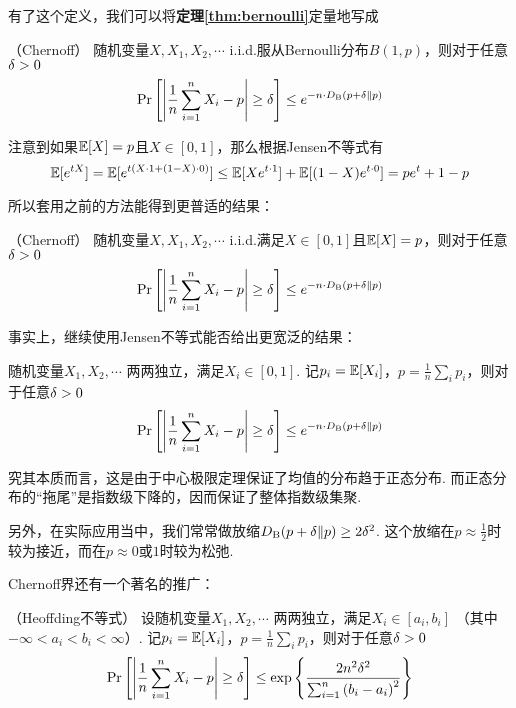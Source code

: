 有了这个定义，我们可以将\textbf{定理\ref{thm:bernoulli}}定量地写成 
\begin{theorem} （Chernoff） \label{thm:chernoff}
    随机变量$X, X_1, X_2, \cdots$ i.i.d.服从Bernoulli分布$B(1,p)$，则对于任意$\delta > 0$ 
    \[
    \Pr\left[
        \left\vert
            \dfrac 1n \sum_{i=1}^n X_i - p
        \right\vert \ge \delta
    \right] \le e^{-n\cdot D_{\mathrm{B}}(p + \delta \| p)}
    \]
\end{theorem}

注意到如果$\mathbb{E}[X]=p$且$X \in [0,1]$，那么根据Jensen不等式有 
\[
\mathbb{E}[e^{tX}] = \mathbb{E}[e^{t(X\cdot 1 + (1-X)\cdot 0)}] \le \mathbb{E}[Xe^{t\cdot 1}] + \mathbb{E}[(1-X)e^{t\cdot 0}] =pe^t + 1-p
\]

所以套用之前的方法能得到更普适的结果：
\begin{corollary} （Chernoff）
    随机变量$X, X_1, X_2, \cdots$ i.i.d.满足$X\in [0, 1]$且$\mathbb{E}[X]=p$，则对于任意$\delta > 0$ 
    \[
    \Pr\left[
        \left\vert
            \dfrac 1n \sum_{i=1}^n X_i - p
        \right\vert \ge \delta
    \right] \le e^{-n\cdot D_{\mathrm{B}}(p + \delta \| p)}
    \]
\end{corollary}

事实上，继续使用Jensen不等式能否给出更宽泛的结果：
\begin{corollary} 
    随机变量$X_1, X_2, \cdots$ 两两独立，满足$X_i\in [0,1]$. 记$p_i = \mathbb{E}[X_i]$，$p = \frac{1}{n}\sum_i p_i$，则对于任意$\delta > 0$
    \[
    \Pr\left[
        \left\vert
            \dfrac 1n \sum_{i=1}^n X_i - p
        \right\vert \ge \delta
    \right] \le e^{-n\cdot D_{\mathrm{B}}(p + \delta \| p)}
    \]
\end{corollary}

究其本质而言，这是由于中心极限定理保证了均值的分布趋于正态分布. 而正态分布的“拖尾”是指数级下降的，因而保证了整体指数级集聚.

另外，在实际应用当中，我们常常做放缩$D_{\mathrm{B}}(p+\delta \| p) \ge 2\delta^2$. 这个放缩在$p \approx \frac 12$时较为接近，而在$p\approx 0$或$1$时较为松弛.

Chernoff界还有一个著名的推广：
\begin{theorem} （Heoffding不等式）
    设随机变量$X_1, X_2, \cdots$ 两两独立，满足$X_i\in [a_i, b_i]$ （其中$-\infty < a_i < b_i < \infty$）. 记$p_i = \mathbb{E}[X_i]$，$p = \frac{1}{n}\sum_i p_i$，则对于任意$\delta > 0$
    \[
    \Pr\left[
        \left\vert
            \dfrac 1n \sum_{i=1}^n X_i - p
        \right\vert \ge \delta
    \right] \le \exp\left\{
        \dfrac{2n^2\delta^2}{\sum_{i=1}^n {(b_i - a_i)}^2}
    \right\}
    \]
\end{theorem}

